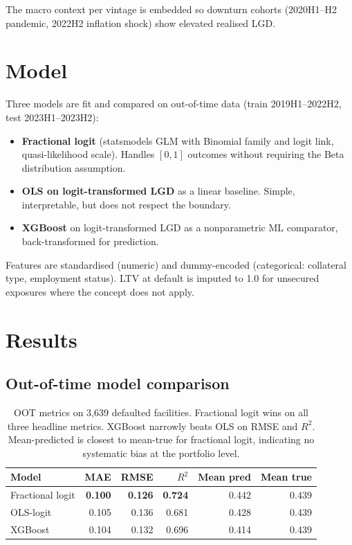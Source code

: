 \documentclass[a4paper,11pt]{article}
\begin{document}
The macro context per vintage is embedded so downturn cohorts
(2020H1--H2 pandemic, 2022H2 inflation shock) show elevated realised
LGD.

\section{Model}

Three models are fit and compared on out-of-time data (train
2019H1--2022H2, test 2023H1--2023H2):

\begin{itemize}
  \item \textbf{Fractional logit} (statsmodels GLM with Binomial family
        and logit link, quasi-likelihood scale). Handles $[0,1]$
        outcomes without requiring the Beta distribution assumption.
  \item \textbf{OLS on logit-transformed LGD} as a linear baseline.
        Simple, interpretable, but does not respect the boundary.
  \item \textbf{XGBoost} on logit-transformed LGD as a nonparametric
        ML comparator, back-transformed for prediction.
\end{itemize}

Features are standardised (numeric) and dummy-encoded (categorical:
collateral type, employment status). LTV at default is imputed to 1.0
for unsecured exposures where the concept does not apply.

\section{Results}

\subsection{Out-of-time model comparison}

\begin{table}[H]
\centering
\begin{tabular}{l r r r r r}
\toprule
\textbf{Model} & \textbf{MAE} & \textbf{RMSE} & \textbf{$R^2$} & \textbf{Mean pred} & \textbf{Mean true} \\
\midrule
Fractional logit & \textbf{0.100} & \textbf{0.126} & \textbf{0.724} & 0.442 & 0.439 \\
OLS-logit        & 0.105 & 0.136 & 0.681 & 0.428 & 0.439 \\
XGBoost          & 0.104 & 0.132 & 0.696 & 0.414 & 0.439 \\
\bottomrule
\end{tabular}
\caption{OOT metrics on 3{,}639 defaulted facilities. Fractional logit
wins on all three headline metrics. XGBoost narrowly beats OLS on
RMSE and $R^2$. Mean-predicted is closest to mean-true for fractional
logit, indicating no systematic bias at the portfolio level.}
\end{table}
\end{document}
